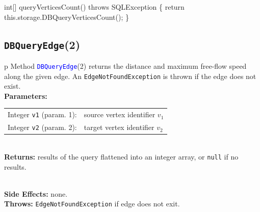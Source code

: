\nwenddocs{}\endmoddef{}
int[] queryVerticesCount() throws SQLException \{
  return this.storage.DBQueryVerticesCount();
\}
\eatline
{}\nwendcode{}\nwdocspar
\subsection{\texttt{DBQueryEdge}(2)}
\begin{tabular}{p{\textwidth}}
\toprule
{}
Method \textcolor{blue}{{\tt{}\protect{}DBQueryEdge}}(2) returns the distance and
maximum free-flow speed along the given edge.
An {\tt{}EdgeNotFoundException} is thrown if the edge does not exist.\\
\midrule
\textbf{Parameters:} \\
\begin{tabular}{lp{116mm}}
Integer {\tt{}v1} (param. 1):&source vertex identifier $v_1$\\
Integer {\tt{}v2} (param. 2):&target vertex identifier $v_2$
\end{tabular}\\
\textbf{Returns:} results of the query flattened into an integer array, or
{\tt{}null} if no results.

\\
\textbf{Side Effects:} none.\\
\textbf{Throws:} {\tt{}EdgeNotFoundException} if edge does not exit.\\
\bottomrule
\end{tabular}
\nwenddocs{}\endmoddef{}
